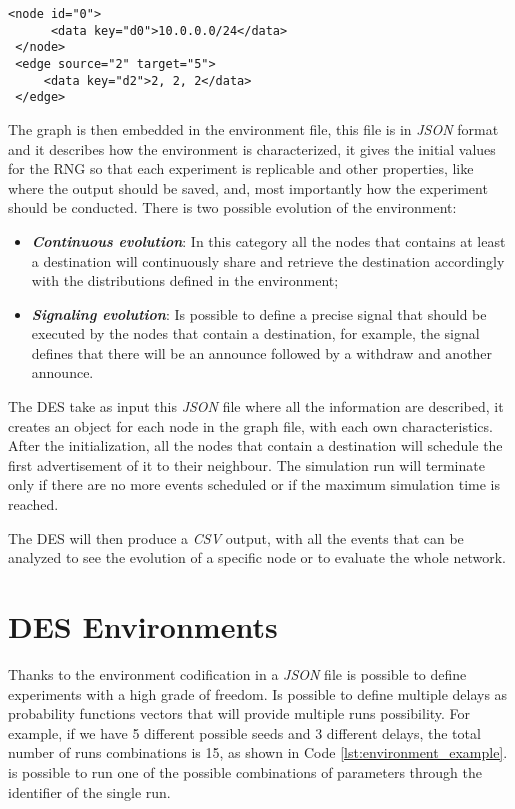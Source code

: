 \begin{lstlisting}[language=graphml, caption=Graph example, label=lst:graph_example]
 <node id="0">
      <data key="d0">10.0.0.0/24</data>
 </node>
 <edge source="2" target="5">                                                  
     <data key="d2">2, 2, 2</data>                                             
 </edge> 
\end{lstlisting}

The graph is then embedded in the environment file, this file is in \textit{JSON}
format and it describes how the environment is characterized, it gives the 
initial values for the \ac{RNG} so that each experiment is replicable and
other properties, like where the output should be saved, and, most importantly
how the experiment should be conducted.
There is two possible evolution of the environment:
\begin{itemize}
    \item \textbf{\textit{Continuous evolution}}: In this category all the nodes
    that contains at least a destination will continuously share and retrieve
    the destination accordingly with the distributions defined in the environment;
    \item \textbf{\textit{Signaling evolution}}: Is possible to define a precise
    signal that should be executed by the nodes that contain a destination, for 
    example, the signal  defines that there will be an announce followed by 
    a withdraw and another announce.
\end{itemize}

The \ac{DES} take as input this \textit{JSON} file where all the information
are described, it creates an object for each node in the graph file, with
each own characteristics.
After the initialization, all the nodes that contain a destination will schedule
the first advertisement of it to their neighbour.
The simulation run will terminate only if there are no more events scheduled or
if the maximum simulation time is reached.

The \ac{DES} will then produce a \textit{CSV} output, with all the events that 
can be analyzed to see the evolution of a specific node or to evaluate the
whole network.
 
\section{DES Environments}
\label{sec:des_environment}

Thanks to the environment codification in a \textit{JSON} file is possible to
define experiments with a high grade of freedom. 
Is possible to define multiple delays as probability functions vectors that
will provide multiple runs possibility. For example, if we have \num{5} different
possible seeds and \num{3} different delays, the total number of runs combinations
is \num{15}, as shown in Code \ref{lst:environment_example}.
is possible to run one of the possible combinations of parameters through the identifier
of the single run.

